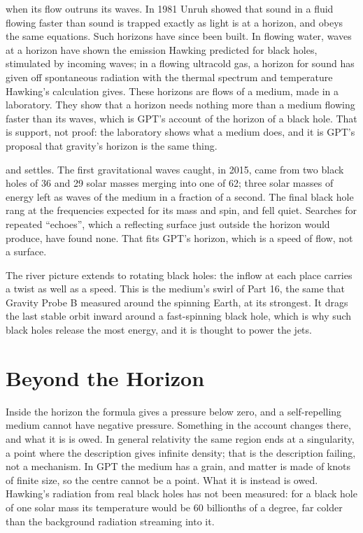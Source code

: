 when its flow outruns its waves. In 1981 Unruh showed that sound in a fluid flowing faster than sound is trapped exactly as light is at a horizon, and obeys the same equations. Such horizons have since been built. In flowing water, waves at a horizon have shown the emission Hawking predicted for black holes, stimulated by incoming waves; in a flowing ultracold gas, a horizon for sound has given off spontaneous radiation with the thermal spectrum and temperature Hawking's calculation gives. These horizons are flows of a medium, made in a laboratory. They show that a horizon needs nothing more than a medium flowing faster than its waves, which is GPT's account of the horizon of a black hole. That is support, not proof: the laboratory shows what a medium does, and it is GPT's proposal that gravity's horizon is the same thing.

 and settles. The first gravitational waves caught, in 2015, came from two black holes of 36 and 29 solar masses merging into one of 62; three solar masses of energy left as waves of the medium in a fraction of a second. The final black hole rang at the frequencies expected for its mass and spin, and fell quiet. Searches for repeated ``echoes'', which a reflecting surface just outside the horizon would produce, have found none. That fits GPT's horizon, which is a speed of flow, not a surface.

 The river picture extends to rotating black holes: the inflow at each place carries a twist as well as a speed. This is the medium's swirl of Part 16, the same that Gravity Probe B measured around the spinning Earth, at its strongest. It drags the last stable orbit inward around a fast-spinning black hole, which is why such black holes release the most energy, and it is thought to power the jets.

\section{Beyond the Horizon}

\begin{openbar}
Inside the horizon the formula gives a pressure below zero, and a self-repelling medium cannot have negative pressure.\footnotemark{} Something in the account changes there, and what it is is owed. In general relativity the same region ends at a singularity, a point where the description gives infinite density; that is the description failing, not a mechanism. In GPT the medium has a grain, and matter is made of knots of finite size, so the centre cannot be a point. What it is instead is owed. Hawking's radiation from real black holes has not been measured: for a black hole of one solar mass its temperature would be 60 billionths of a degree, far colder than the background radiation streaming into it.
\end{openbar}

